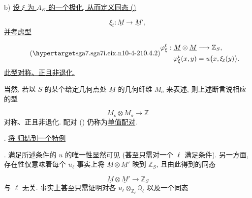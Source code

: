\smallskip
\noindent
b) \underline{设 $\xi$ 为 $A_K$ 的一个极化, 从而定义同态 ()}

\begin{equation*}
\xi_t:\underline M\longrightarrow\underline M',
\end{equation*}
\underline{并考虑型}

\begin{equation}\tag{\SGARefTarget{sga7.sga7i.eix.n10-4-2}{10.4.2}}
\begin{aligned}
\varphi_\xi^t:\underline M\otimes\underline M
  &\longrightarrow\mathbb Z_S,\\
\varphi_\xi^t(x,y)&=u\bigl(x,\xi_t(y)\bigr).
\end{aligned}
\end{equation}
\underline{此型对称、正且非退化.}

当然, 若以 $S$ 的某个给定几何点处 $\underline M$ 的几何纤维 $M_o$ 来表述, 则上述断言说相应的型

\begin{equation*}
M_o\otimes M_o\longrightarrow\mathbb Z
\end{equation*}
对称、正且非退化. 配对 () 仍称为\underline{单值配对}.



\medskip
\noindent
{}. \underline{将  归结到一个特例}

\smallskip
\noindent
{}. 满足所述条件的 $u$ 的唯一性显然可见 (甚至只需对一个 $\ell$ 满足条件). 另一方面, 存在性仅意味着每个 $u_\ell$ 事实上将 $\underline M\otimes\underline M'$ 映到 $\mathbb Z_S$, 且由此得到的同态

\begin{equation*}
\underline M\otimes\underline M'\longrightarrow\mathbb Z_S
\end{equation*}
与 $\ell$ 无关. 事实上甚至只需证明对各 $u_\ell\otimes_{\mathbb Z_\ell}\mathbb Q_\ell$ 以及一个同态

